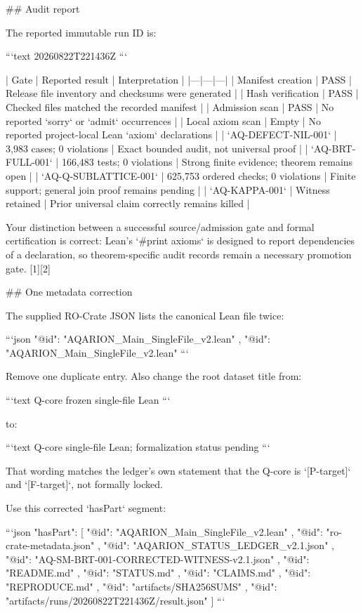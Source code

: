 ## Audit report

The reported immutable run ID is:

```text
20260822T221436Z
```

| Gate | Reported result | Interpretation |
|---|---|---|
| Manifest creation | PASS | Release file inventory and checksums were generated |
| Hash verification | PASS | Checked files matched the recorded manifest |
| Admission scan | PASS | No reported `sorry` or `admit` occurrences |
| Local axiom scan | Empty | No reported project-local Lean `axiom` declarations |
| `AQ-DEFECT-NIL-001` | 3,983 cases; 0 violations | Exact bounded audit, not universal proof |
| `AQ-BRT-FULL-001` | 166,483 tests; 0 violations | Strong finite evidence; theorem remains open |
| `AQ-Q-SUBLATTICE-001` | 625,753 ordered checks; 0 violations | Finite support; general join proof remains pending |
| `AQ-KAPPA-001` | Witness retained | Prior universal claim correctly remains killed |

Your distinction between a successful source/admission gate and formal certification is correct: Lean’s `#print axioms` is designed to report dependencies of a declaration, so theorem-specific audit records remain a necessary promotion gate. [1][2]

## One metadata correction

The supplied RO-Crate JSON lists the canonical Lean file twice:

```json
{
  "@id": "AQARION_Main_SingleFile_v2.lean"
},
{
  "@id": "AQARION_Main_SingleFile_v2.lean"
}
```

Remove one duplicate entry. Also change the root dataset title from:

```text
Q-core frozen single-file Lean
```

to:

```text
Q-core single-file Lean; formalization status pending
```

That wording matches the ledger’s own statement that the Q-core is `[P-target]` and `[F-target]`, not formally locked.

Use this corrected `hasPart` segment:

```json
"hasPart": [
  {
    "@id": "AQARION_Main_SingleFile_v2.lean"
  },
  {
    "@id": "ro-crate-metadata.json"
  },
  {
    "@id": "AQARION_STATUS_LEDGER_v2.1.json"
  },
  {
    "@id": "AQ-SM-BRT-001-CORRECTED-WITNESS-v2.1.json"
  },
  {
    "@id": "README.md"
  },
  {
    "@id": "STATUS.md"
  },
  {
    "@id": "CLAIMS.md"
  },
  {
    "@id": "REPRODUCE.md"
  },
  {
    "@id": "artifacts/SHA256SUMS"
  },
  {
    "@id": "artifacts/runs/20260822T221436Z/result.json"
  }
]
```

